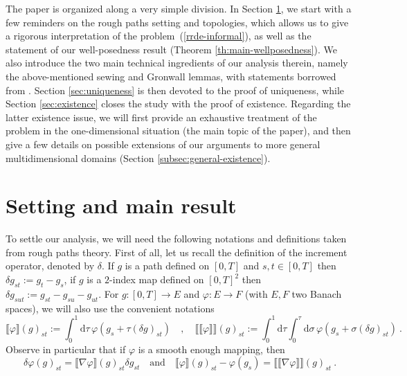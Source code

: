 \documentclass[11pt,reqno,oneside]{amsart}
\numberwithin{equation}{section}
\newcommand{\assign}{:=}
\newcommand{\mathd}{\mathrm{d}}
\begin{document}
\smallskip

The paper is organized along a very simple division. In Section \ref{sec:setting}, we start with a few reminders on the rough paths setting and topologies, which allows us to give a rigorous interpretation of the problem~(\ref{rrde-informal}), as well as the statement of our well-posedness result (Theorem \ref{th:main-wellposedness}). We also introduce the two main technical ingredients of our analysis therein, namely the above-mentioned sewing and Gronwall lemmas, with statements borrowed from \cite{conservation-laws}. Section \ref{sec:uniqueness} is then devoted to the proof of uniqueness, while Section \ref{sec:existence} closes the study with the proof of existence. {Regarding the latter existence issue, we will first provide an exhaustive treatment of the problem in the one-dimensional situation (the main topic of the paper), and then give a few details on possible extensions of our arguments to more general multidimensional domains (Section \ref{subsec:general-existence}).}

\section{Setting and main result}\label{sec:setting}



To settle our analysis, we will need the following notations and definitions taken from rough paths theory. First of all, let us recall
the definition of the increment operator, denoted by $\delta$. If $g$ is a
path defined on $[0, T]$ and $s, t \in [0, T]$ then $\delta g_{st} \assign g_t
- g_s$, if $g$ is a $2$-index map defined on $[0, T]^2$ then $\delta g_{sut}
\assign g_{st} - g_{su} - g_{ut}$. For $g:[0,T]\to E$ and $\varphi: E\to F$ (with $E,F$ two Banach spaces), we will also use the convenient notations
\begin{equation}\label{eq:notation-brackets}
\llbracket \varphi \rrbracket (g)_{st}:=\int_0^1\mathd \tau \, \varphi(g_s+\tau (\delta g)_{st}) \quad , \quad \llbracket \llbracket \varphi \rrbracket \rrbracket (g)_{st}:=\int_0^1\mathd \tau\int_0^\tau \mathd \sigma \, \varphi(g_s+\sigma (\delta g)_{st}) \ .
\end{equation}
Observe in particular that if $\varphi$ is a smooth enough mapping, then
\begin{equation}\label{eq:brackets-phi}
\delta \varphi (g)_{st}=\llbracket \nabla \varphi \rrbracket (g)_{st} \delta g_{st} \quad \text{and} \quad \llbracket \varphi \rrbracket (g)_{st}-\varphi(g_s) =\llbracket \llbracket \nabla \varphi\rrbracket \rrbracket (g)_{st} \ .
\end{equation}
\end{document}
